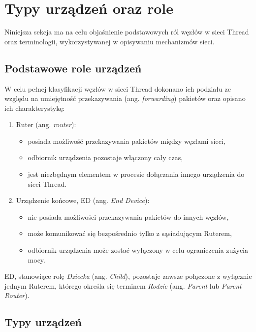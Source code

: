\section{Typy urządzeń oraz role}
\label{sec:device-types}

    Niniejsza sekcja ma na celu objaśnienie podstawowych ról węzłów w sieci Thread oraz terminologii, wykorzystywanej w opisywaniu mechanizmów sieci.

    \subsection{Podstawowe role urządzeń}

    W celu pełnej klasyfikacji węzłów w sieci Thread dokonano ich podziału ze względu na umiejętność przekazywania (ang. \textit{forwarding}) pakietów oraz opisano ich charakterystykę:
    \begin{enumerate}
        \item Ruter (ang. \textit{router}):
        \begin{itemize}
            \item posiada możliwość przekazywania pakietów między węzłami sieci,
            \item odbiornik urządzenia pozostaje włączony cały czas,
            \item jest niezbędnym elementem w procesie dołączania innego urządzenia do sieci Thread.
        \end{itemize}
        \item Urządzenie końcowe, ED (ang. \textit{End Device}):
        \begin{itemize}
            \item nie posiada możliwości przekazywania pakietów do innych węzłów,
            \item może komunikować się bezpośrednio tylko z sąsiadującym Ruterem,
            \item odbiornik urządzenia może zostać wyłączony w celu ograniczenia zużycia mocy.
        \end{itemize}
    \end{enumerate}

    ED, stanowiące rolę \textit{Dziecka} (ang. \textit{Child}), pozostaje zawsze połączone z wyłącznie jednym Ruterem, którego określa się terminem \textit{Rodzic} (ang. \textit{Parent} lub \textit{Parent Router}).

    \subsection{Typy urządzeń}
    \label{subsec:device-types}

